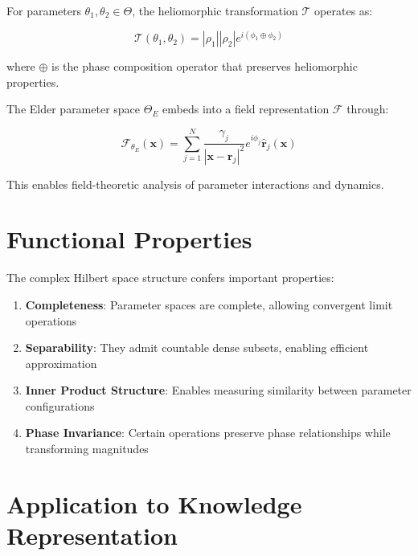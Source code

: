 \begin{theorem}
For parameters $\theta_1, \theta_2 \in \Theta$, the heliomorphic transformation $\mathcal{T}$ operates as:

\begin{equation}
\mathcal{T}(\theta_1, \theta_2) = |\rho_1||\rho_2|e^{i(\phi_1 \oplus \phi_2)}
\end{equation}

where $\oplus$ is the phase composition operator that preserves heliomorphic properties.
\end{theorem}

\begin{theorem}
The Elder parameter space $\Theta_E$ embeds into a field representation $\mathcal{F}$ through:

\begin{equation}
\mathcal{F}_{\theta_E}(\mathbf{x}) = \sum_{j=1}^N \frac{\gamma_j}{|\mathbf{x} - \mathbf{r}_j|^2} e^{i\phi_j} \hat{\mathbf{r}}_j(\mathbf{x})
\end{equation}

This enables field-theoretic analysis of parameter interactions and dynamics.
\end{theorem}

\section{Functional Properties}

The complex Hilbert space structure confers important properties:

\begin{enumerate}
    \item \textbf{Completeness}: Parameter spaces are complete, allowing convergent limit operations
    
    \item \textbf{Separability}: They admit countable dense subsets, enabling efficient approximation
    
    \item \textbf{Inner Product Structure}: Enables measuring similarity between parameter configurations
    
    \item \textbf{Phase Invariance}: Certain operations preserve phase relationships while transforming magnitudes
\end{enumerate}

\section{Application to Knowledge Representation}

